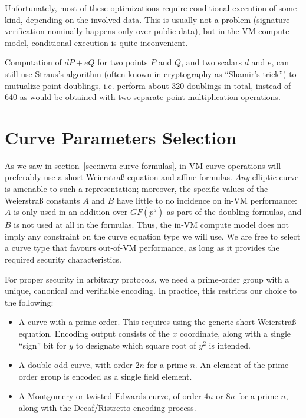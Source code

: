 \documentclass{llncs}
\newcommand{\GF}{GF}
\begin{document}
Unfortunately, most of these optimizations require conditional execution
of some kind, depending on the involved data. This is usually not a
problem (signature verification nominally happens only over public
data), but in the VM compute model, conditional execution is quite
inconvenient.

Computation of $d P + e Q$ for two points $P$ and $Q$, and two scalars
$d$ and $e$, can still use Straus's algorithm\cite{Str1964} (often known
in cryptography as ``Shamir's trick'') to mutualize point doublings,
i.e. perform about 320 doublings in total, instead of 640 as would be
obtained with two separate point multiplication operations.

\section{Curve Parameters Selection}

As we saw in section~\ref{sec:invm-curve-formulas}, in-VM curve
operations will preferably use a short Weierstraß equation and affine
formulas. \emph{Any} elliptic curve is amenable to such a
representation; moreover, the specific values of the Weierstraß
constants $A$ and $B$ have little to no incidence on in-VM performance:
$A$ is only used in an addition over $\GF(p^5)$ as part of the doubling
formulas, and $B$ is not used at all in the formulas. Thus, the in-VM
compute model does not imply any constraint on the curve equation type
we will use. We are free to select a curve type that favours out-of-VM
performance, as long as it provides the required security
characteristics.

For proper security in arbitrary protocols, we need a prime-order group
with a unique, canonical and verifiable encoding\cite{CreJac2019}. In
practice, this restricts our choice to the following:
\begin{itemize}

    \item A curve with a prime order. This requires using the generic
    short Weierstraß equation. Encoding output consists of the $x$
    coordinate, along with a single ``sign'' bit for $y$ to designate
    which square root of $y^2$ is intended.

    \item A double-odd curve\cite{Por2020-4}, with order $2n$ for a
    prime $n$. An element of the prime order group is encoded as
    a single field element.

    \item A Montgomery or twisted Edwards curve, of order $4n$ or $8n$
    for a prime $n$, along with the Decaf/Ristretto encoding
    process\cite{Ham2015,RistrettoWeb}.

\end{itemize}
\end{document}
